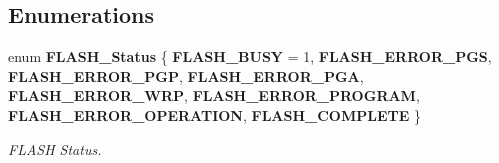 \subsection*{Enumerations}
\begin{DoxyCompactItemize}
\item 
enum \textbf{ F\+L\+A\+S\+H\+\_\+\+Status} \{ \newline
\textbf{ F\+L\+A\+S\+H\+\_\+\+B\+U\+SY} = 1, 
\textbf{ F\+L\+A\+S\+H\+\_\+\+E\+R\+R\+O\+R\+\_\+\+P\+GS}, 
\textbf{ F\+L\+A\+S\+H\+\_\+\+E\+R\+R\+O\+R\+\_\+\+P\+GP}, 
\textbf{ F\+L\+A\+S\+H\+\_\+\+E\+R\+R\+O\+R\+\_\+\+P\+GA}, 
\newline
\textbf{ F\+L\+A\+S\+H\+\_\+\+E\+R\+R\+O\+R\+\_\+\+W\+RP}, 
\textbf{ F\+L\+A\+S\+H\+\_\+\+E\+R\+R\+O\+R\+\_\+\+P\+R\+O\+G\+R\+AM}, 
\textbf{ F\+L\+A\+S\+H\+\_\+\+E\+R\+R\+O\+R\+\_\+\+O\+P\+E\+R\+A\+T\+I\+ON}, 
\textbf{ F\+L\+A\+S\+H\+\_\+\+C\+O\+M\+P\+L\+E\+TE}
 \}\begin{DoxyCompactList}\small\item\em F\+L\+A\+SH Status. \end{DoxyCompactList}
\end{DoxyCompactItemize}
